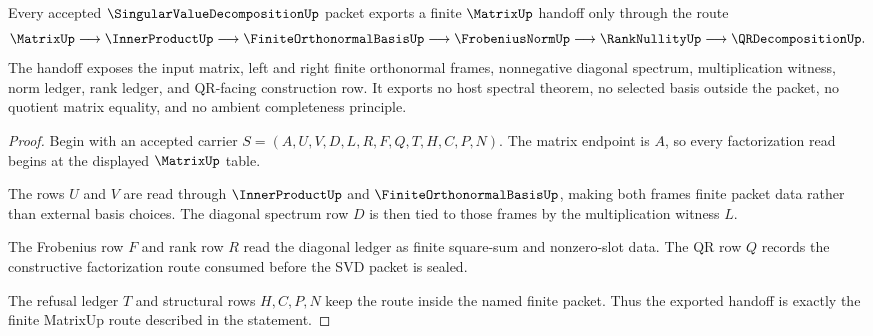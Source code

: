 \begin{theorem}
\label{thm:singular-value-decomposition-finite-matrix-handoff}
Every accepted $\SingularValueDecompositionUp$ packet exports a finite $\MatrixUp$ handoff only through the route
$$
\MatrixUp \longrightarrow \InnerProductUp \longrightarrow \FiniteOrthonormalBasisUp \longrightarrow \FrobeniusNormUp \longrightarrow \RankNullityUp \longrightarrow \QRDecompositionUp .
$$
The handoff exposes the input matrix, left and right finite orthonormal frames, nonnegative diagonal spectrum, multiplication witness, norm ledger, rank ledger, and QR-facing construction row. It exports no host spectral theorem, no selected basis outside the packet, no quotient matrix equality, and no ambient completeness principle.
\end{theorem}
\begin{proof}
Begin with an accepted carrier $S=(A,U,V,D,L,R,F,Q,T,H,C,P,N)$. The matrix endpoint is $A$, so every factorization read begins at the displayed $\MatrixUp$ table.

The rows $U$ and $V$ are read through $\InnerProductUp$ and $\FiniteOrthonormalBasisUp$, making both frames finite packet data rather than external basis choices. The diagonal spectrum row $D$ is then tied to those frames by the multiplication witness $L$.

The Frobenius row $F$ and rank row $R$ read the diagonal ledger as finite square-sum and nonzero-slot data. The QR row $Q$ records the constructive factorization route consumed before the SVD packet is sealed.

The refusal ledger $T$ and structural rows $H,C,P,N$ keep the route inside the named finite packet. Thus the exported handoff is exactly the finite MatrixUp route described in the statement.
\end{proof}


